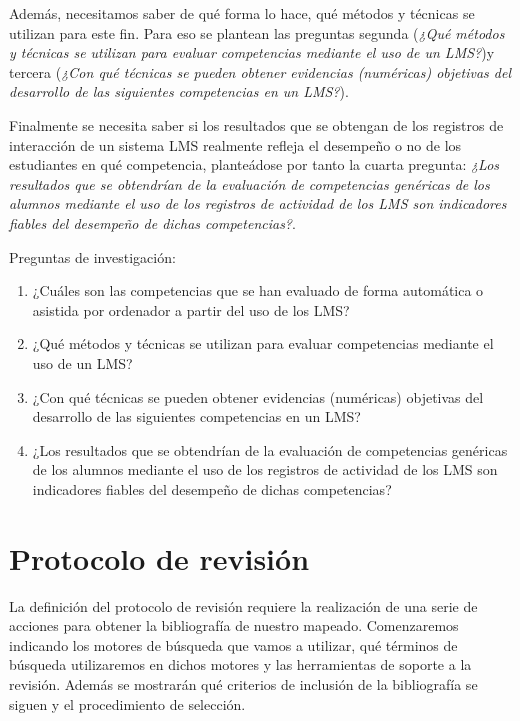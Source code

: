 Además, necesitamos saber de qué forma lo hace, qué métodos y técnicas se utilizan para este fin. Para eso se plantean las preguntas segunda (\emph{¿Qué métodos y técnicas se utilizan para evaluar competencias mediante el uso de un LMS?})y tercera (\emph{¿Con qué técnicas se pueden obtener evidencias (numéricas) objetivas del desarrollo de las siguientes competencias en un LMS?}).

Finalmente se necesita saber si los resultados que se obtengan de los registros de interacción de un sistema LMS realmente refleja el desempeño o no de los estudiantes en qué competencia, planteádose por tanto la cuarta pregunta: \emph{¿Los resultados que se obtendrían de la evaluación de competencias genéricas de los alumnos mediante el uso de los registros de actividad de los LMS son indicadores fiables del desempeño de dichas competencias?}.

\bigskip
Preguntas de investigación:
\begin{enumerate}
\item ¿Cuáles son las competencias que se han evaluado de forma automática o asistida por ordenador a partir del uso de los LMS?
\item ¿Qué métodos y técnicas se utilizan para evaluar competencias mediante el uso de un LMS?
\item ¿Con qué técnicas se pueden obtener evidencias (numéricas) objetivas del desarrollo de las siguientes competencias en un LMS?
\item ¿Los resultados que se obtendrían de la evaluación de competencias genéricas de los alumnos mediante el uso de los registros de actividad de los LMS son indicadores fiables del desempeño de dichas competencias?
\end{enumerate}

\section{Protocolo de revisión}

La definición del protocolo de revisión requiere la realización de una serie de acciones para obtener la bibliografía de nuestro mapeado. Comenzaremos indicando los motores de búsqueda que vamos a utilizar, qué términos de búsqueda utilizaremos en dichos motores y las herramientas de soporte a la revisión. Además se mostrarán qué criterios de inclusión de la bibliografía se siguen y el procedimiento de selección.

